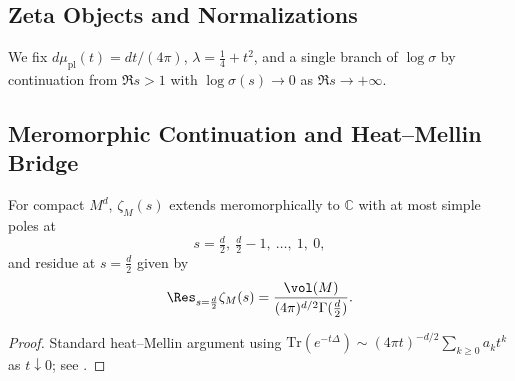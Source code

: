 \subsection{Zeta Objects and Normalizations} \label{subsec:zeta-objects} %

\begin{definition} \label{def:Zeta-Objects} %
\begin{enumerate}[label=(\alph*),itemsep=2pt]
  \item Spectral zeta (compact \(M\)):
  \[
     \zeta_M(s):=\sum_{j\ge1}\lambda_j^{-s},\qquad \Re s>\tfrac d2.
  ] %
  \item Selberg zeta (cofinite \(\Gamma\subset\mathrm{PSL}_2(\mathbb R)\)):
  \[
     Z_\Gamma(s):=\prod_{p}\prod_{k=0}^{\infty}\bigl(1-e^{-(s+k)\ell(p)}\bigr),\qquad \Re s>1,
  ] %
  where \(p\) ranges over primitive closed geodesics with length \(\ell(p)\). %
  \item Scattering determinant: \(\sigma(s):=\det\mathbf S(s)\), with \(\mathbf S(s)\mathbf S(1-s)=\mathbf I\). %
\end{enumerate}
\end{definition}

\begin{remark} %
We fix \(d\mu_{\mathrm{pl}}(t)=dt/(4\pi)\), \(\lambda=\tfrac14+t^2\), and a single branch of \(\log\sigma\) by continuation from \(\Re s>1\) with \(\log\sigma(s)\to0\) as \(\Re s\to+\infty\). %
\end{remark}

\subsection{Meromorphic Continuation and Heat–Mellin Bridge} \label{subsec:meromorphicity} %

\begin{theorem} \label{thm:merom-zetaM} %
For compact \(M^d\), \(\zeta_M(s)\) extends meromorphically to \(\mathbb C\) with at most simple poles at
\[
  s=\tfrac d2,\ \tfrac d2-1,\ \ldots,\ 1,\ 0,
\]
and residue at \(s=\tfrac d2\) given by
\[
  \Res_{s=\frac d2}\zeta_M(s)=\frac{\vol(M)}{(4\pi)^{d/2}\Gamma(\tfrac d2)}.
\]
\end{theorem}

\begin{proof}
Standard heat–Mellin argument using \(\mathrm{Tr}(e^{-t\Delta})\sim(4\pi t)^{-d/2}\sum_{k\ge0}a_k t^k\) as \(t\downarrow0\); see \cite{Seeley,MinakPleijel}. %
\end{proof}

